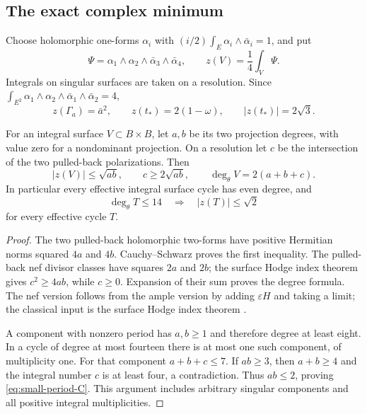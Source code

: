 \subsection{The exact complex minimum}

Choose holomorphic one-forms $\alpha_i$ with
$(i/2)\int_E\alpha_i\wedge\bar\alpha_i=1$, and put
\[
 \Psi=\alpha_1\wedge\alpha_2\wedge\bar\alpha_3\wedge\bar\alpha_4,
 \qquad z(V)=\frac14\int_V\Psi.
\]
Integrals on singular surfaces are taken on a resolution.  Since
$\int_{E^2}\alpha_1\wedge\alpha_2\wedge\bar\alpha_1\wedge\bar\alpha_2=4$,
\begin{equation}
\label{eq:z-normalization}
 z(\Gamma_a)=\bar a^2,\qquad z(t_*)=2(1-\omega),\qquad |z(t_*)|=2\sqrt3.
\end{equation}

\begin{lemma}
\label{lem:P08}
For an integral surface $V\subset B\times B$, let $a,b$ be its two projection degrees, with value zero for a nondominant projection.  On a resolution let $c$ be the intersection of the two pulled-back polarizations.  Then
\[
 |z(V)|\leq\sqrt{ab},\qquad c\geq2\sqrt{ab},\qquad
 \deg_\theta V=2(a+b+c).
\]
In particular every effective integral surface cycle has even degree, and
\begin{equation}
\label{eq:small-period-C}
 \deg_\theta T\leq14\quad\Longrightarrow\quad |z(T)|\leq\sqrt2
\end{equation}
for every effective cycle $T$.
\end{lemma}
\begin{proof}
The two pulled-back holomorphic two-forms have positive Hermitian norms squared $4a$ and $4b$.  Cauchy--Schwarz proves the first inequality.  The pulled-back nef divisor classes have squares $2a$ and $2b$; the surface Hodge index theorem gives $c^2\geq4ab$, while $c\geq0$.  Expansion of their sum proves the degree formula.  The nef version follows from the ample version by adding $\varepsilon H$ and taking a limit; the classical input is the surface Hodge index theorem \cite[Chapter V, Theorem 1.9]{Hartshorne}.

A component with nonzero period has $a,b\geq1$ and therefore degree at least eight.  In a cycle of degree at most fourteen there is at most one such component, of multiplicity one.  For that component $a+b+c\leq7$.  If $ab\geq3$, then $a+b\geq4$ and the integral number $c$ is at least four, a contradiction.  Thus $ab\leq2$, proving \eqref{eq:small-period-C}.  This argument includes arbitrary singular components and all positive integral multiplicities.
\end{proof}

